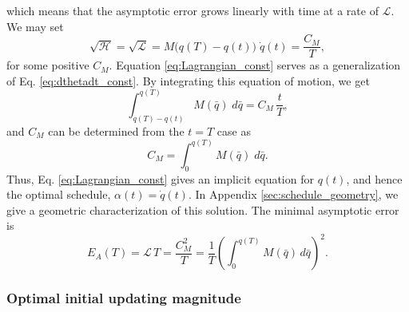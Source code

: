 \documentclass[reprint, superscriptaddress, floatfix]{revtex4-1}
\newcommand{\Err}{E}
\begin{document}
which means that the asymptotic error grows
linearly with time at a rate of $\mathcal L$.
We may set
%
\begin{equation}
  \sqrt{ \mathcal H }
  =
  \sqrt{ \mathcal L }
  =
  M\bigl( q(T) - q(t) \bigr)
  \;
  \dot q(t)
  =
  \frac{C_M}{T}
  ,
  \label{eq:Lagrangian_const}
\end{equation}
%
for some positive $C_M$.
%
Equation \eqref{eq:Lagrangian_const} serves
as a generalization of Eq. \eqref{eq:dthetadt_const}.
%
By integrating this equation of motion, we get
%
\begin{equation}
  \int_{ q(T) - q(t) }^{ q(T) }
    M(\bar q)
    \;
    d \bar q
  =
  C_M \, \frac t T
  ,
  \label{eq:q_opt}
\end{equation}
%
and $C_M$ can be determined from
the $t = T$ case as
%
\begin{equation}
  C_M =
  \int_{ 0 }^{ q(T) }
    M( \bar q )
    \;
    d \bar q
  .
  \label{eq:mint}
\end{equation}
%
Thus, Eq. \eqref{eq:Lagrangian_const}
gives an implicit equation for $q(t)$,
and hence the optimal schedule,
$\alpha(t) = \dot q(t)$.
%
In Appendix \ref{sec:schedule_geometry},
we give a geometric characterization of this solution.
%
The minimal asymptotic error is
%
\begin{equation}
  \Err_A(T)
  =
  \mathcal L \, T
  =
  \frac { C_M^2 } { T }
  =
  \frac 1 T
  \left(
    \int_0^{ q(T) } M(\bar q) \, d \bar q
  \right)^2
  .
\label{eq:error_asym2}
\end{equation}






\subsubsection{\label{sec:optinitalpha}
  Optimal initial updating magnitude
}
\end{document}
